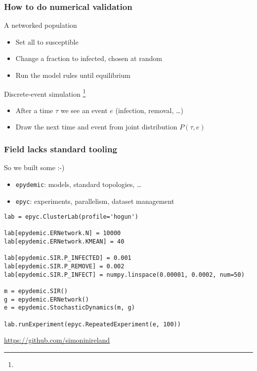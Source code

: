 \documentclass{beamer}
\renewcommand{\cite}[1]{
  \footnote[frame]{\tiny{\bibentry{#1}}}
}
\begin{document}
\begin{frame}
  \frametitle{How to do numerical validation}

  \begin{block}{A networked population}
    \begin{itemize}
    \item Set all to susceptible
    \item Change a fraction to infected, chosen at random
    \item Run the model rules until equilibrium
    \end{itemize}
  \end{block}
  
  \begin{block}{Discrete-event simulation\cite{Gil77}}
    \begin{itemize}
    \item After a time $\tau$ we  see an event $e$ (infection,
      removal, \ldots)
    \item Draw the next time and event from joint distribution
      $P(\tau, e)$
    \end{itemize}
  \end{block}
\end{frame}

\begin{frame}[fragile]
  \frametitle{Field lacks standard tooling}

  \begin{block}{So we built some :-)}
    \begin{itemize}
    \item \texttt{epydemic}: models, standard topologies, \ldots
    \item \texttt{epyc}: experiments, parallelism, dataset management
    \end{itemize}
  \end{block}

  \begin{lstlisting}
lab = epyc.ClusterLab(profile='hogun')

lab[epydemic.ERNetwork.N] = 10000
lab[epydemic.ERNetwork.KMEAN] = 40
        
lab[epydemic.SIR.P_INFECTED] = 0.001
lab[epydemic.SIR.P_REMOVE] = 0.002
lab[epydemic.SIR.P_INFECT] = numpy.linspace(0.00001, 0.0002, num=50)
        
m = epydemic.SIR()
g = epydemic.ERNetwork()
e = epydemic.StochasticDynamics(m, g)
        
lab.runExperiment(epyc.RepeatedExperiment(e, 100))
  \end{lstlisting}

  \hfill{\tiny \url{https://github.com/simoninireland}}
\end{frame}
\end{document}
